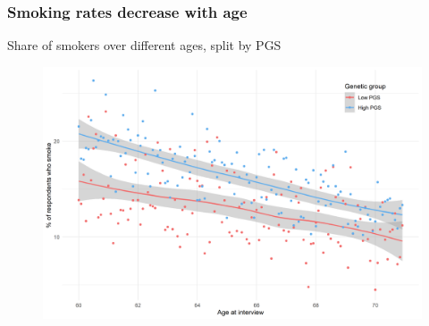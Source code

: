 \documentclass[10pt,compress,xcolor=dvipsnames]{beamer}    %
\newcounter{ex}
\newcommand{\1}[1]{\mathrm{1\hspace*{-2.5pt}l}[#1]}	%
\begin{document}
\begin{frame}
\frametitle{Smoking rates decrease with age}
Share of smokers over different ages, split by PGS

\begin{figure}[hbtp]
\centering
\includegraphics[height=0.8\textheight]{../../3_output/over_time/graph_6070smokenplot_agebypgs.png}
\label{fig:}
\end{figure}

\end{frame}
\end{document}
